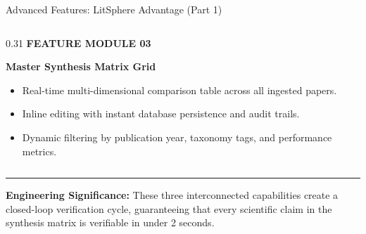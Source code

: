 \documentclass[aspectratio=169,10pt]{beamer}
\begin{document}
\begin{frame}{Advanced Features: LitSphere Advantage (Part 1)}
\begin{columns}[T]
  \begin{column}{0.31\textwidth}
    {\fontsize{6.8pt}{8.5pt}\selectfont\bfseries\color{SubText} FEATURE MODULE 03}\par\vspace{2pt}
    {\fontsize{9.5pt}{11.5pt}\selectfont\bfseries\color{DarkText} Master Synthesis Matrix Grid}\par\vspace{4pt}
    {\fontsize{7.2pt}{9.2pt}\selectfont\color{DarkText}
    \begin{itemize}
      \item Real-time multi-dimensional comparison table across all ingested papers.
      \item Inline editing with instant database persistence and audit trails.
      \item Dynamic filtering by publication year, taxonomy tags, and performance metrics.
    \end{itemize}}
  \end{column}
\end{columns}

\vspace{0.45cm}
\rule{14.2cm}{0.4pt}\par\vspace{0.12cm}
{\fontsize{7.2pt}{9pt}\selectfont\color{DarkText}
\textbf{Engineering Significance:} These three interconnected capabilities create a closed-loop verification cycle, guaranteeing that every scientific claim in the synthesis matrix is verifiable in under 2 seconds.}
\end{frame}
\end{document}
